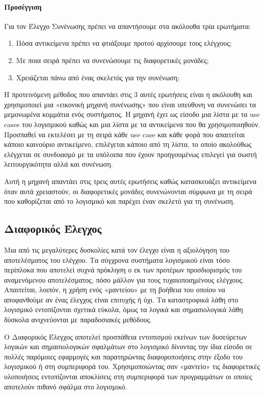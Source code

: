 \documentclass[12pt]{article}
\begin{document}
\paragraph{Προσέγγιση}

Για τον Έλεγχο Συνένωσης πρέπει να απαντήσουμε στα ακόλουθα τρία ερωτήματα:

\begin{enumerate}
  \item Πόσα αντικείμενα πρέπει να φτιάξουμε προτού αρχίσουμε τους ελέγχους;
  \item Με ποια σειρά πρέπει να συνενώσουμε τις διαφορετικές μονάδες;
  \item Χρειάζεται πάνω από ένας σκελετός για την συνένωση;
\end{enumerate}

\par Η προτεινόμενη μέθοδος που απαντάει στις 3 αυτές ερωτήσεις είναι η ακόλουθη και χρησιμοποιεί μια «εικονική μηχανή συνένωσης» που είναι υπεύθυνη να συνενώσει τα μεμονωμένα κομμάτια ενός συστήματος. Η μηχανή έχει ως είσοδο μια λίστα με τα use cases του λογισμικού καθώς και μια λίστα με τα αντικείμενα που θα χρησιμοποιηθούν. Προσπαθεί να εκτελέσει με τη σειρά κάθε use case και κάθε φορά που απαιτείται κάποιο καινούριο αντικείμενο, επιλέγεται κάποιο από τη λίστα, το οποίο ακολούθως ελέγχεται σε συνδυασμό με τα υπόλοιπα που έχουν προηγουμένως επιλεγεί για σωστή λειτουργικότητα αλλά και συνένωση.

\par Αυτή η μηχανή απαντάει στις τρεις αυτές ερωτήσεις καθώς κατασκευάζει αντικείμενα όταν αυτά χρειαστούν, οι διαφορετικές μονάδες συνενώνονται σύμφωνα με τη σειρά που καθορίζεται από το λογισμικό και παρέχει έναν σκελετό για τη συνένωση.

\subsection{Διαφορικός Έλεγχος} 

Μια από τις μεγαλύτερες δυσκολίες κατά τον έλεγχο είναι η αξιολόγηση του αποτελέσματος του ελέγχου. Τα σύγχρονα συστήματα λογισμικού είναι τόσο περίπλοκα που αποτελεί συχνά πρόκληση ο εκ των προτέρων προσδιορισμός του αναμενόμενου αποτελέσματος, πόσο μάλλον για τους τυχαιοποιημένους ελέγχους. Απαιτείται, λοιπόν, η χρήση ενός «μαντείου» με τη βοήθεια του οποίου να αποφανθούμε αν ένας έλεγχος είναι επιτυχής ή όχι. Τα καταστροφικά λάθη στο λογισμικό εντοπίζονται σχετικά εύκολα, όμως τα λογικά και σημασιολογικά λάθη δύσκολα ανιχνεύονται με παραδοσιακές μεθόδους.
\par Ο Διαφορικός Έλεγχος αποτελεί προσπάθεια εντοπισμού εκείνων των δυσεύρετων λογικών και σημασιολογικών σφαλμάτων στο λογισμικό δίνοντας την ίδια είσοδο σε πολλές παρόμοιες εφαρμογές και παρατηρώντας διαφοροποιήσεις στην έξοδο του λογισμικού ή στη συμπεριφορά του. Χρησιμοποιώντας σαν «μαντείο» τις διαφορετικές υλοποιήσεις εντοπίζονται αποκλίσεις στη συμπεριφορά των προγραμμάτων οι οποίες αποτελούν πιθανό σφάλμα στο λογισμικό.
\cite{william}
\cite{wiki}
\end{document}
